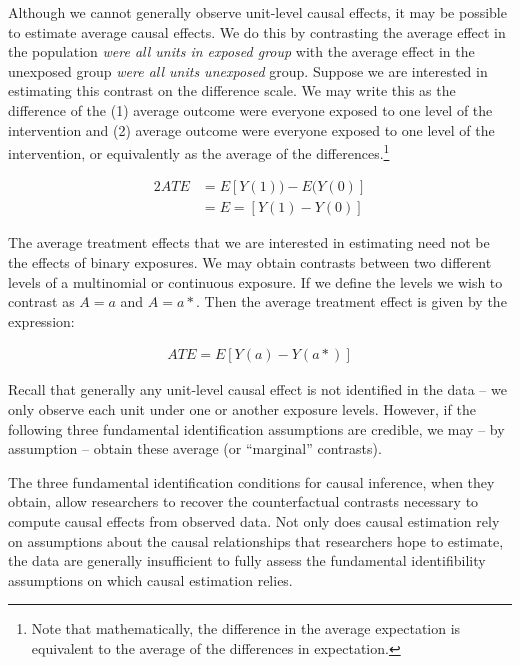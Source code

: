 \documentclass[
  singlecolumn]{report}
\begin{document}
Although we cannot generally observe unit-level causal effects, it may
be possible to estimate average causal effects. We do this by
contrasting the average effect in the population \emph{were all units in
exposed group} with the average effect in the unexposed group \emph{were
all units unexposed} group. Suppose we are interested in estimating this
contrast on the difference scale. We may write this as the difference of
the (1) average outcome were everyone exposed to one level of the
intervention and (2) average outcome were everyone exposed to one level
of the intervention, or equivalently as the average of the
differences.\footnote{Note that mathematically, the difference in the
  average expectation is equivalent to the average of the differences in
  expectation.}

\begin{alignat*}{2}
ATE & = E[Y(1)) - E(Y(0)]\\
& = E=[Y(1) - Y(0)]
\end{alignat*}

The average treatment effects that we are interested in estimating need
not be the effects of binary exposures. We may obtain contrasts between
two different levels of a multinomial or continuous exposure. If we
define the levels we wish to contrast as \(A = a\) and \(A = a*\). Then
the average treatment effect is given by the expression:

   \begin{align*}
    ATE = E[Y(a) - Y(a*)]
    \end{align*}

Recall that generally any unit-level causal effect is not identified in
the data -- we only observe each unit under one or another exposure
levels. However, if the following three fundamental identification
assumptions are credible, we may -- by assumption -- obtain these
average (or ``marginal'' contrasts).

The three fundamental identification conditions for causal inference,
when they obtain, allow researchers to recover the counterfactual
contrasts necessary to compute causal effects from observed data. Not
only does causal estimation rely on assumptions about the causal
relationships that researchers hope to estimate, the data are generally
insufficient to fully assess the fundamental identifibility assumptions
on which causal estimation relies.
\end{document}
